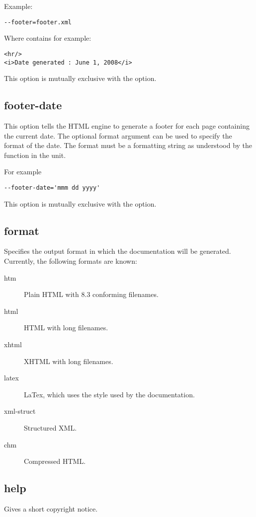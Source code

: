 Example:
\begin{verbatim}
--footer=footer.xml
\end{verbatim}
Where  contains for example:
\begin{verbatim}
<hr/>
<i>Date generated : June 1, 2008</i>
\end{verbatim}

This option is mutually exclusive with the  option.

\subsection{footer-date}
\label{suse:footerdate}
This option tells the HTML engine to generate a footer for each page
containing the current date. The optional format argument can be used
to specify the format of the date. The format must be a formatting string
as understood by the  function in the  
unit.

For example
\begin{verbatim}
--footer-date='mmm dd yyyy'
\end{verbatim}

This option is mutually exclusive with the  option.

\subsection{format}
\label{suse:format}
Specifies the output format in which the documentation will be generated. 
Currently, the following formats are known:
\begin{description}
\item[htm] Plain HTML with 8.3 conforming filenames. 
\item[html] HTML with long filenames.
\item[xhtml] XHTML with long filenames.
\item[latex] LaTex, which uses the  style used by the \fpc
documentation. 
\item[xml-struct] Structured XML.
\item[chm] Compressed HTML.
\end{description}

\subsection{help}
Gives a short copyright notice.

